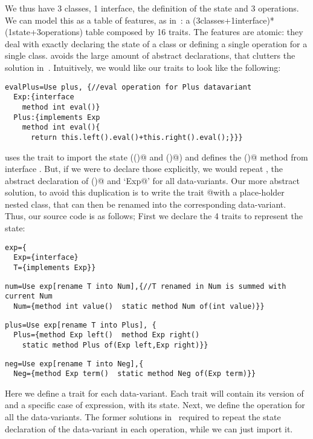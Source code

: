 We thus have 3 classes, 1 interface,
the definition of the state and 3 operations.
We can model this
as a table of features, as in~\cite{deep}:
a (3classes+1interface)*(1state+3operations)
table composed by 16 traits.
The features are atomic: they deal with exactly 
declaring the state of a class
or defining a single operation for a single class.
\name avoids the large amount of abstract declarations,
that clutters the solution in~\cite{deep}.
Intuitively, we would like our traits to look like the following:
\begin{lstlisting}
evalPlus=Use plus, {//eval operation for Plus datavariant
  Exp:{interface
    method int eval()}
  Plus:{implements Exp
    method int eval(){
      return this.left().eval()+this.right().eval();}}}
\end{lstlisting}
\Q@evalPlus@ uses the trait \Q@plus@ to import the state (\Q@left()@ and \Q@right()@)
and defines the \Q@eval()@ method from interface \Q@Exp@.
But, if we were to declare those
explicitly, we would repeat \Q@Exp@, the abstract
declaration of \Q@eval()@ and `\Q@implements Exp@'
for all data-variants.
Our more abstract solution, to avoid this duplication is to write 
the trait \Q@eval @with a place-holder \Q@T@ nested class, that can then be renamed
into the corresponding data-variant.
Thus, our source code is as follows;
First we declare the 4 traits to represent the state:
\newcommand\multiCode{\vspace{-5pt}}
\saveSpace
\begin{lstlisting}
exp={
  Exp={interface}
  T={implements Exp}}
\end{lstlisting}
\multiCode
\begin{lstlisting}
num=Use exp[rename T into Num],{//T renamed in Num is summed with current Num
  Num={method int value()  static method Num of(int value)}}
\end{lstlisting}
\multiCode
\begin{lstlisting}
plus=Use exp[rename T into Plus], {
  Plus={method Exp left()  method Exp right()
    static method Plus of(Exp left,Exp right)}}
\end{lstlisting}
\multiCode
\begin{lstlisting}
neg=Use exp[rename T into Neg],{
  Neg={method Exp term()  static method Neg of(Exp term)}}
\end{lstlisting}
Here we define a trait for each data-variant.
Each trait will contain its version of \Q@Exp@
and a specific case of expression, with its state.
Next, we define the operation \Q@eval@ for all the data-variants.
The former solutions in~\cite{deep}
required to repeat the state declaration of the 
data-variant in each operation, while we can just import it.

